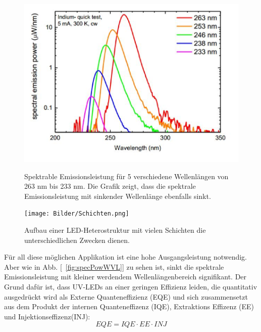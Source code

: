 \begin{figure}[htb]
    \centering
    \begin{minipage}[t]{0.49\linewidth}
        \centering
        \includegraphics[width=\linewidth]{Bilder/SpectralEmissionPower_Wavelength.png}
        \caption{Spektrable Emissionsleistung für 5 verschiedene Wellenlängen von 263 nm bis 233 nm. Die Grafik zeigt, dass die spektrale Emissionsleistung mit sinkender Wellenlänge ebenfalls sinkt\cite{semreich}.}
        \label{fig:specPowWVL}
    \end{minipage}
    \hfill
    \begin{minipage}[t]{0.49\linewidth}
        \centering
        \texttt{[image: Bilder/Schichten.png]}
        \caption{Aufbau einer LED-Heterostruktur mit vielen Schichten die unterschiedlichen Zwecken dienen.}
        \label{fig:schichtenLED}
    \end{minipage}
\end{figure}
\vspace{1cm}
\raggedright
Für all diese möglichen Applikation ist eine hohe Ausgangsleistung notwendig. Aber wie in Abb. [~\ref{fig:specPowWVL}] zu sehen ist, sinkt die spektrale Emissionsleistung mit kleiner werdendem Wellenlängenbereich signifikant. Der Grund dafür ist, dass UV-LEDs an einer geringen Effizienz leiden, die quantitativ ausgedrückt wird als Externe Quanteneffizienz (EQE) und sich zusammensetzt aus dem Produkt der internen Quanteneffizenz (IQE), Extraktions Effizenz (EE) und Injektionseffizenz(INJ):
%
\begin{equation}
    EQE = IQE \cdot EE \cdot INJ
\end{equation}
%
